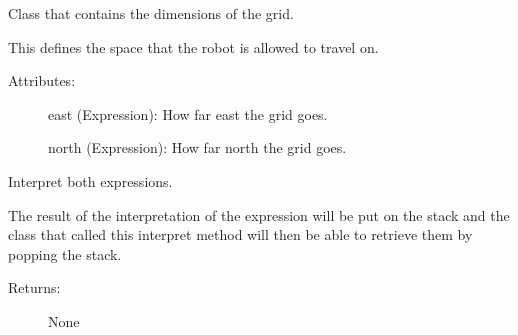 \documentclass[letterpaper,10pt,english]{sphinxmanual}
\begin{document}
\begin{fulllineitems}
\label{\detokenize{robol:robol_lang.robol.Grid}}
\sphinxAtStartPar
Class that contains the dimensions of the grid.

\sphinxAtStartPar
This defines the space that the robot is allowed to travel on.
\begin{description}
\item[{Attributes:}] \leavevmode
\sphinxAtStartPar
east (Expression): How far east the grid goes.

\sphinxAtStartPar
north (Expression): How far north the grid goes.

\end{description}

\begin{fulllineitems}
\label{\detokenize{robol:robol_lang.robol.Grid.interpret}}
\sphinxAtStartPar
Interpret both expressions.

\sphinxAtStartPar
The result of the interpretation of the expression will be put on the
stack and the class that called this interpret method will then be
able to retrieve them by popping the stack.
\begin{description}
\item[{Returns:}] \leavevmode
\sphinxAtStartPar
None

\end{description}

\end{fulllineitems}


\end{fulllineitems}

\end{document}

